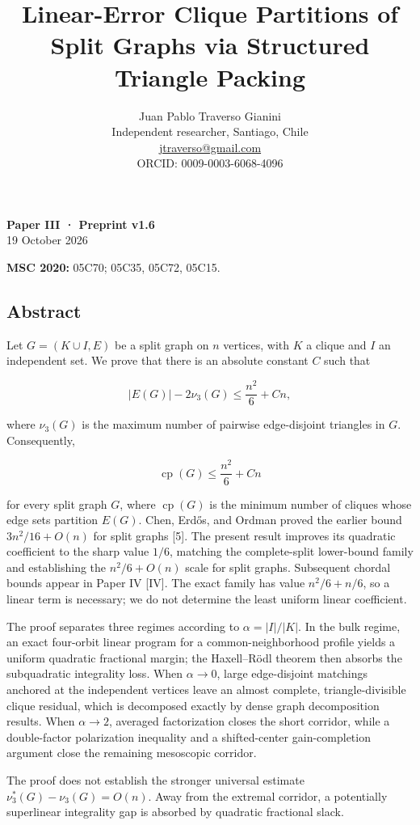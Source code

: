 \documentclass[english,11pt,a4paper]{article}
\title{Linear-Error Clique Partitions of Split Graphs via Structured Triangle Packing}
\author{Juan Pablo Traverso Gianini\\\small Independent researcher, Santiago, Chile\\\small \href{mailto:jtraverso@gmail.com}{jtraverso@gmail.com}\\\small ORCID: 0009-0003-6068-4096}
\date{}
\begin{document}
\raggedbottom
\maketitle
\textbf{Paper III · Preprint v1.6}\\
19 October 2026

\textbf{MSC 2020:} 05C70; 05C35, 05C72, 05C15.

\subsection{Abstract}\label{abstract}

Let \(G=(K\cup I,E)\) be a split graph on \(n\) vertices, with \(K\) a
clique and \(I\) an independent set. We prove that there is an absolute
constant \(C\) such that

\[
|E(G)|-2\nu_3(G)
\le
\frac{n^2}{6}+Cn,
\]

where \(\nu_3(G)\) is the maximum number of pairwise edge-disjoint
triangles in \(G\). Consequently,

\[
\operatorname{cp}(G)
\le
\frac{n^2}{6}+Cn
\]

for every split graph \(G\), where \(\operatorname{cp}(G)\) is the
minimum number of cliques whose edge sets partition \(E(G)\). Chen,
Erdős, and Ordman proved the earlier bound \(3n^2/16+O(n)\) for split
graphs {[}5{]}. The present result improves its quadratic coefficient to
the sharp value \(1/6\), matching the complete-split lower-bound family
and establishing the \(n^2/6+O(n)\) scale for split graphs. Subsequent
chordal bounds appear in Paper IV {[}IV{]}. The exact family has value
\(n^2/6+n/6\), so a linear term is necessary; we do not determine the
least uniform linear coefficient.

The proof separates three regimes according to \(\alpha=|I|/|K|\). In
the bulk regime, an exact four-orbit linear program for a
common-neighborhood profile yields a uniform quadratic fractional
margin; the Haxell--Rödl theorem then absorbs the subquadratic
integrality loss. When \(\alpha\to0\), large edge-disjoint matchings
anchored at the independent vertices leave an almost complete,
triangle-divisible clique residual, which is decomposed exactly by dense
graph decomposition results. When \(\alpha\to2\), averaged factorization
closes the short corridor, while a double-factor polarization inequality
and a shifted-center gain-completion argument close the remaining
mesoscopic corridor.

The proof does not establish the stronger universal estimate
\(\nu_3^*(G)-\nu_3(G)=O(n)\). Away from the extremal corridor, a
potentially superlinear integrality gap is absorbed by quadratic
fractional slack.
\end{document}
